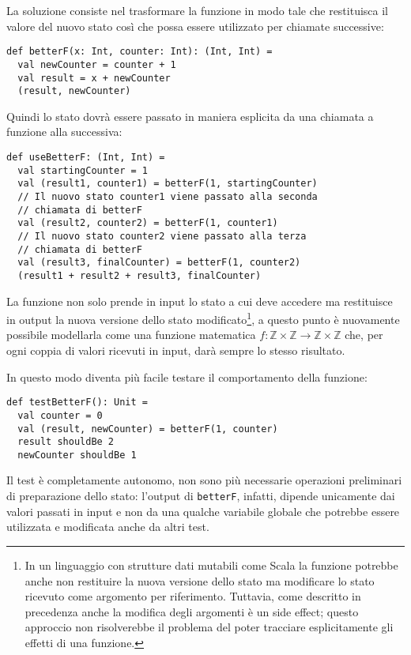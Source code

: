   La soluzione consiste nel trasformare la funzione in modo tale che restituisca il valore del nuovo stato così che possa essere utilizzato per chiamate successive:
  \begin{lstlisting}[language=scala3]
def betterF(x: Int, counter: Int): (Int, Int) =
  val newCounter = counter + 1
  val result = x + newCounter
  (result, newCounter)
\end{lstlisting}
  Quindi lo stato dovrà essere passato in maniera esplicita da una chiamata a funzione alla successiva:
  \begin{lstlisting}[language=scala3, label=lst:use-better-f]
def useBetterF: (Int, Int) =
  val startingCounter = 1
  val (result1, counter1) = betterF(1, startingCounter)
  // Il nuovo stato counter1 viene passato alla seconda
  // chiamata di betterF
  val (result2, counter2) = betterF(1, counter1)
  // Il nuovo stato counter2 viene passato alla terza
  // chiamata di betterF
  val (result3, finalCounter) = betterF(1, counter2)
  (result1 + result2 + result3, finalCounter)
\end{lstlisting}
  La funzione non solo prende in input lo stato a cui deve accedere ma restituisce in output la nuova versione dello stato modificato\footnote{In un linguaggio con strutture dati mutabili come Scala la funzione potrebbe anche non restituire la nuova versione dello stato ma modificare lo stato ricevuto come argomento per riferimento. Tuttavia, come descritto in precedenza anche la modifica degli argomenti è un side effect; questo approccio non risolverebbe il problema del poter tracciare esplicitamente gli effetti di una funzione.}, a questo punto è nuovamente possibile modellarla come una funzione matematica $f : \mathbb{Z}\times\mathbb{Z} \rightarrow \mathbb{Z}\times\mathbb{Z}$ che, per ogni coppia di valori ricevuti in input, darà sempre lo stesso risultato.

In questo modo diventa più facile testare il comportamento della funzione:
\begin{lstlisting}[language=scala3]
def testBetterF(): Unit =
  val counter = 0
  val (result, newCounter) = betterF(1, counter)
  result shouldBe 2
  newCounter shouldBe 1
\end{lstlisting}
Il test è completamente autonomo, non sono più necessarie operazioni preliminari di preparazione dello stato: l'output di \lstinline{betterF}, infatti, dipende unicamente dai valori passati in input e non da una qualche variabile globale che potrebbe essere utilizzata e modificata anche da altri test.

